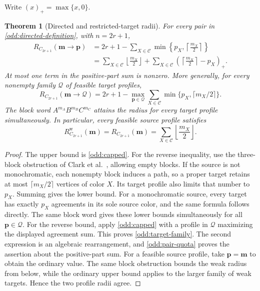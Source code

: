 \documentclass[10pt,a4paper]{amsart}
\numberwithin{equation}{section}
\newtheorem{theorem}{Theorem}[section]
\theoremstyle{definition}
\theoremstyle{remark}
\begin{document}
Write $(x)_+=\max\{x,0\}$.
\begin{theorem}[Directed and restricted-target radii]\label{odd:directed}
For every pair in \cref{odd:directed-definition}, with $n=2r+1$,
\begin{align*}
 R_{C_{2r+1}}(\mathbf m\to\mathbf p)
 &=2r+1-\sum_{X\in\mathcal C}
       \min\left\{p_X,\left\lceil\frac{m_X}{2}\right\rceil\right\}\\
 &=\sum_{X\in\mathcal C}\left\lfloor\frac{m_X}{2}\right\rfloor
   +\sum_{X\in\mathcal C}
       \left(\left\lceil\frac{m_X}{2}\right\rceil-p_X\right)_+.
\end{align*}
At most one term in the positive-part sum is nonzero.
More generally, for every nonempty family $\mathcal Q$ of feasible
target profiles,
\begin{equation}\label{odd:target-family}
R_{C_{2r+1}}(\mathbf m\to\mathcal Q)
=2r+1-\max_{\mathbf p\in\mathcal Q}
 \sum_{X\in\mathcal C}\min\{p_X,\lceil m_X/2\rceil\}.
\end{equation}
The block word $A^{m_A}B^{m_B}C^{m_C}$ attains the radius for every
target profile simultaneously.
In particular, every feasible source profile satisfies
\[
 R^{\mathrm w}_{C_{2r+1}}(\mathbf m)
 =R_{C_{2r+1}}(\mathbf m)
 =\sum_{X\in\mathcal C}\left\lfloor\frac{m_X}{2}\right\rfloor.
\]
\end{theorem}
\begin{proof}
The upper bound is \cref{odd:capped}. For the reverse inequality,
use the three-block obstruction of
Clark et al.~\cite[Proposition~3.5]{clark2006}, allowing empty blocks.
If the source is not monochromatic, each nonempty block induces a
path, so a proper target retains at most $\lceil m_X/2\rceil$
vertices of color $X$. Its target profile also limits that number
to $p_X$. Summing gives the lower bound. For a monochromatic
source, every target has exactly $p_X$ agreements in its sole source
color, and the same formula follows directly.
The same block word gives these lower bounds simultaneously for all
$\mathbf p\in\mathcal Q$. For the reverse bound, apply
\cref{odd:capped} with a profile in $\mathcal Q$ maximizing the
displayed agreement sum. This proves \eqref{odd:target-family}.
The second expression is an algebraic rearrangement, and
\eqref{odd:pair-quota} proves the assertion about the positive-part
sum. For a feasible source profile, take $\mathbf p=\mathbf m$
to obtain the ordinary value. The same block obstruction bounds
the weak radius from below, while the ordinary upper bound applies
to the larger family of weak targets. Hence the two profile radii agree.
\end{proof}
\end{document}
